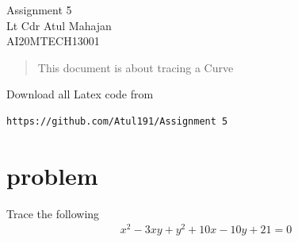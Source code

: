 \documentclass[journal,12pt,twocolumn]{IEEEtran}
\numberwithin{equation}{subsection}
\begin{document}
\begin{center}
\huge Assignment 5\\
\large Lt Cdr Atul Mahajan\\
\large AI20MTECH13001\\
\end{center}
\begin{abstract}
This document is about tracing a Curve
\end{abstract}
Download all Latex code from 
\begin{lstlisting}
https://github.com/Atul191/Assignment 5
\end{lstlisting}
\section{problem}
Trace the following 
\begin{align}
    x^2-3xy+y^2+10x-10y+21=0 \label{eq 1}
\end{align}
\end{document}
